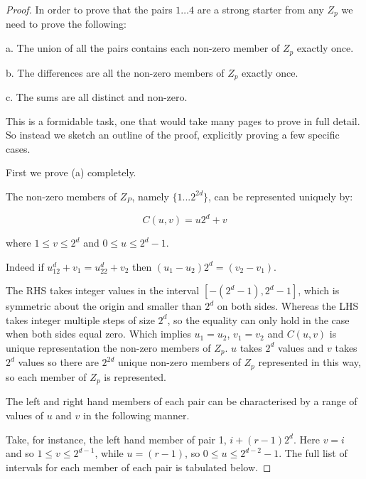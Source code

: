 \documentclass[
  11pt,
  a4paper]{book}
\begin{document}
\begin{proof}
In order to prove that the pairs $1 \ldots 4$ are a strong
starter from any $Z_p$ we need to prove the following:

  a. The union of all the pairs contains each non-zero
     member of $Z_p$ exactly once.

  b. The differences are all the non-zero members of $Z_p$
     exactly once.

  c. The sums are all distinct and non-zero.

This is a formidable task, one that would take many pages to
prove in full detail. So instead we sketch an outline of the
proof, explicitly proving a few specific cases.

First we prove (a) completely.

The non-zero members of $Z_P$, namely $\{1...2^{2d}\}$, can
be represented uniquely by:

$$C(u, v) = u2^d + v$$

where $1 \leq v \leq 2^d$ and $0 \leq u \leq 2^d-1$.

Indeed if $u_12^d + v_1 = u_22^d + v_2$ then
$(u_1 - u_2)2^d = (v_2 - v_1)$.

The RHS takes integer values in
the interval $[-(2^d - 1), 2^d - 1]$, which is symmetric about
the origin and smaller than $2^d$ on both sides. Whereas the
LHS takes integer multiple steps of size $2^d$, so the
equality can only hold in the case when both sides equal
zero. Which implies $u_1 = u_2$, $v_1 = v_2$ and $C(u, v)$ is
unique representation the non-zero members of $Z_p$. $u$
takes $2^d$ values and $v$ takes $2^d$ values so there are
$2^{2d}$ unique non-zero members of $Z_p$ represented in
this way, so each member of $Z_p$ is represented.

The left and right hand members of each pair can be
characterised by a range of values of $u$ and $v$ in the
following manner.

Take, for instance, the left hand member of pair 1,
$i+(r-1)2^d$. Here $v = i$ and so $1 \leq v \leq 2^{d-1}$,
while $u = (r - 1)$, so $0 \leq u \leq 2^{d-2}-1$. The full
list of intervals for each member of each pair is tabulated
below.

\begin{table}


\end{table}
\end{proof}
\end{document}
